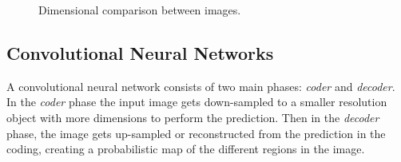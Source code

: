 \begin{figure}[h]
  \centering
  \qquad
  \caption{Dimensional comparison between images.}
  \label{fig:img_dims}
\end{figure}

\subsection{Convolutional Neural Networks}
A convolutional neural network consists of two main phases: \emph{coder} and \emph{decoder}. In the \emph{coder} phase the input image gets down-sampled to a smaller resolution object with more dimensions to perform the prediction. Then in the \emph{decoder} phase, the image gets up-sampled or reconstructed from the prediction in the coding, creating a probabilistic map of the different regions in the image.

